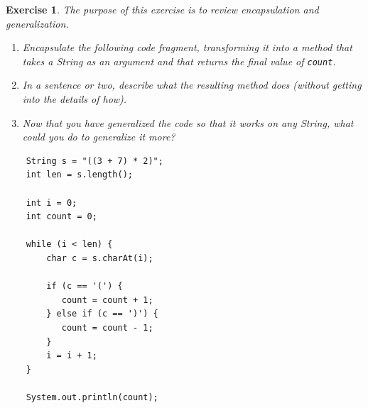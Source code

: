 \documentclass[12pt]{book}
\theoremstyle{exercise}
\newtheorem{exercise}{Exercise}[chapter]
\begin{document}
\begin{exercise}
The purpose of this exercise is to review encapsulation
and generalization.

\begin{enumerate}

\item Encapsulate the following code fragment, transforming it
into a method that takes a String as an argument and that
returns the final value of {\tt count}.

\item In a sentence or two, describe what the resulting method does
(without getting into the details of how).

\item Now that you have generalized the code
so that it works on any String, what could you do to
generalize it more?

\end{enumerate}

\begin{lstlisting}
    String s = "((3 + 7) * 2)";
    int len = s.length();

    int i = 0;
    int count = 0;

    while (i < len) {
        char c = s.charAt(i);

        if (c == '(') {
           count = count + 1;
        } else if (c == ')') {
           count = count - 1;
        }
        i = i + 1;
    }

    System.out.println(count);
\end{lstlisting}
\end{exercise}
\end{document}
